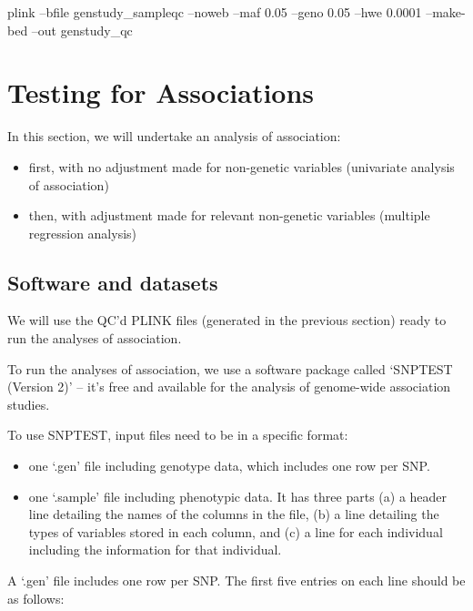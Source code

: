 \documentclass[]{book}
\newenvironment{Shaded}{\begin{snugshade}}{\end{snugshade}}
\newcommand{\ExtensionTok}[1]{#1}
\newcommand{\NormalTok}[1]{#1}
\providecommand{\tightlist}{%
  \setlength{\itemsep}{0pt}\setlength{\parskip}{0pt}}
\begin{document}
\begin{Shaded}
\begin{Highlighting}[]
\ExtensionTok{plink}\NormalTok{ --bfile genstudy_sampleqc --noweb --maf 0.05 --geno 0.05 --hwe 0.0001 --make-bed --out genstudy_qc}
\end{Highlighting}
\end{Shaded}

\section{Testing for Associations}\label{testing-for-associations}

In this section, we will undertake an analysis of association:

\begin{itemize}
\tightlist
\item
  first, with no adjustment made for non-genetic variables (univariate
  analysis of association)
\item
  then, with adjustment made for relevant non-genetic variables
  (multiple regression analysis)
\end{itemize}

\subsection{Software and datasets}\label{software-and-datasets-1}

We will use the QC'd PLINK files (generated in the previous section)
ready to run the analyses of association.

To run the analyses of association, we use a software package called
`SNPTEST (Version 2)' -- it's free and available for the analysis of
genome-wide association studies.

To use SNPTEST, input files need to be in a specific format:

\begin{itemize}
\tightlist
\item
  one `.gen' file including genotype data, which includes one row per
  SNP.
\item
  one `.sample' file including phenotypic data. It has three parts (a) a
  header line detailing the names of the columns in the file, (b) a line
  detailing the types of variables stored in each column, and (c) a line
  for each individual including the information for that individual.
\end{itemize}

A `.gen' file includes one row per SNP. The first five entries on each
line should be as follows:
\end{document}
